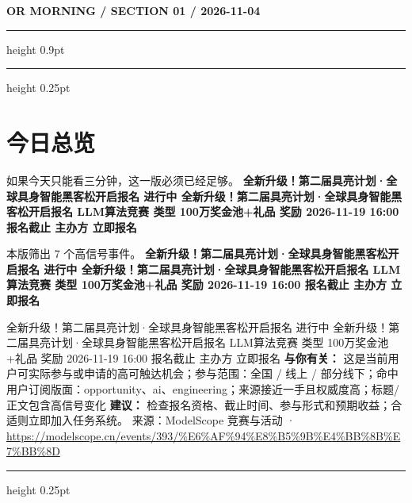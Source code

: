 \documentclass[10.5pt]{ctexart}
\begin{document}
{\small\bfseries OR MORNING / SECTION 01 / 2026-11-04}
\vspace{2mm}
\hrule height 0.9pt
\vspace{1.5mm}
\hrule height 0.25pt
\vspace{4mm}
\section*{今日总览}
{\color{ormuted} 如果今天只能看三分钟，这一版必须已经足够。}
\vspace{2mm}
{\fontsize{25}{29}\selectfont\bfseries 全新升级！第二届具亮计划·全球具身智能黑客松开启报名 进行中 全新升级！第二届具亮计划·全球具身智能黑客松开启报名 LLM算法竞赛 类型 100万奖金池+礼品 奖励 2026-11-19 16:00 报名截止 主办方 立即报名}\par
\vspace{2mm}
{\large 本版筛出 7 个高信号事件。}
\vspace{3mm}
{\Large\bfseries 全新升级！第二届具亮计划·全球具身智能黑客松开启报名 进行中 全新升级！第二届具亮计划·全球具身智能黑客松开启报名 LLM算法竞赛 类型 100万奖金池+礼品 奖励 2026-11-19 16:00 报名截止 主办方 立即报名}\par
全新升级！第二届具亮计划·全球具身智能黑客松开启报名 进行中 全新升级！第二届具亮计划·全球具身智能黑客松开启报名 LLM算法竞赛 类型 100万奖金池+礼品 奖励 2026-11-19 16:00 报名截止 主办方 立即报名
\textbf{与你有关：} 这是当前用户可实际参与或申请的高可触达机会；参与范围：全国 / 线上 / 部分线下；命中用户订阅版面：opportunity、ai、engineering；来源接近一手且权威度高；标题/正文包含高信号变化
\textbf{建议：} 检查报名资格、截止时间、参与形式和预期收益；合适则立即加入任务系统。
{\footnotesize\color{ormuted} 来源：ModelScope 竞赛与活动 · \url{https://modelscope.cn/events/393/%E6%AF%94%E8%B5%9B%E4%BB%8B%E7%BB%8D}}
\vspace{3mm}
\hrule height 0.25pt
\vspace{3mm}
\end{document}
